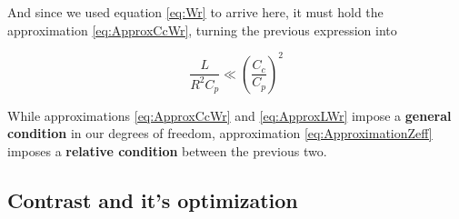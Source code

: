 \documentclass[../main.tex]{subfiles}
\begin{document}
And since we used equation \ref{eq:Wr} to arrive here, it must hold
the approximation \ref{eq:ApproxCcWr}, turning the previous expression into

\begin{equation}
\label{eq:ApproximationZeff}
    \frac{L}{R^2 C_{p}} \ll \left(\frac{C_{c}}{C_{p}}\right)^2
\end{equation}

While approximations \ref{eq:ApproxCcWr} and \ref{eq:ApproxLWr} impose a
\textbf{general condition} in our degrees of freedom, approximation
\ref{eq:ApproximationZeff} imposes a \textbf{relative condition} between
the previous two.

\subsection{Contrast and it's optimization}
\lipsum[1-1]
\end{document}
